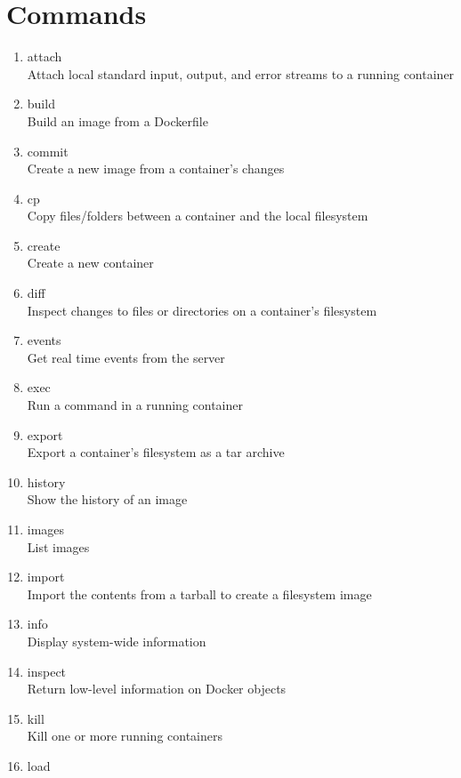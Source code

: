 \newpage

\section{Commands}

\begin{enumerate}
\item attach      \\
    Attach local standard input, output, and error streams to a running container
\item build       \\
    Build an image from a Dockerfile
\item commit      \\
    Create a new image from a container's changes
\item cp          \\
    Copy files/folders between a container and the local filesystem
\item create      \\
    Create a new container
\item diff        \\
    Inspect changes to files or directories on a container's filesystem
\item events      \\
    Get real time events from the server
\item exec        \\
    Run a command in a running container
\item export      \\
    Export a container's filesystem as a tar archive
\item history     \\
    Show the history of an image
\item images      \\
    List images
\item import      \\
    Import the contents from a tarball to create a filesystem image
\item info        \\
    Display system-wide information
\item inspect     \\
    Return low-level information on Docker objects
\item kill        \\
    Kill one or more running containers
\item load        \\

\end{enumerate}
